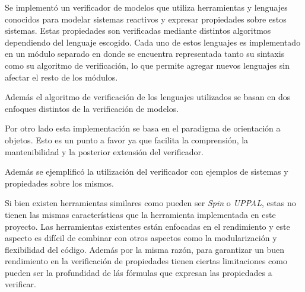 Se implementó un verificador de modelos que utiliza herramientas y lenguajes conocidos
 para modelar sistemas reactivos y expresar propiedades sobre estos sistemas.
Estas propiedades son verificadas mediante distintos algoritmos dependiendo del lenguaje
 escogido.
Cada uno de estos lenguajes es implementado en un módulo separado en donde se encuentra
 representada tanto su sintaxis como su algoritmo de verificación, lo que permite agregar
 nuevos lenguajes sin afectar el resto de los módulos.

Además el algoritmo de verificación de los lenguajes utilizados se basan en dos enfoques
 distintos de la verificación de modelos.

Por otro lado esta implementación se basa en el paradigma de orientación a objetos.
Esto es un punto a favor ya que facilita la comprensión, la mantenibilidad
 y la posterior extensión del verificador.

Además se ejemplificó la utilización del verificador con ejemplos de sistemas y propiedades
 sobre los mismos.

Si bien existen herramientas similares como pueden ser \textit{Spin} o \textit{UPPAL}, estas
 no tienen las mismas características que la herramienta implementada en este proyecto.
Las herramientas existentes están enfocadas en el rendimiento y este aspecto es difícil
 de combinar con otros aspectos como la modularización y flexibilidad del código.
Además por la misma razón, para garantizar un buen rendimiento en la verificación de propiedades
 tienen ciertas limitaciones como pueden ser la profundidad de lás fórmulas que expresan las
 propiedades a verificar.